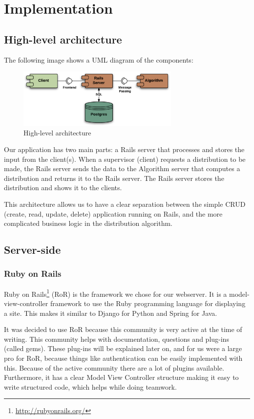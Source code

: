 \section{Implementation}
\subsection{High-level architecture}
The following image shows a UML diagram of the components: 
\begin{figure}[H]
	\caption{High-level architecture}
	\label{fig:high_level_architecture}
	\centering
	\includegraphics[width=8cm]{img/high_level_architecture}
\end{figure}

Our application has two main parts: a Rails server that processes and stores the input from the client(s). When a supervisor (client) requests a distribution to be made, the Rails server sends the data to the Algorithm server that computes a distribution and returns it to the Rails server. The Rails server stores the distribution and shows it to the clients.

This architecture allows us to have a clear separation between the simple CRUD (create, read, update, delete) application running on Rails, and the more complicated business logic in the distribution algorithm.

\subsection{Server-side}
\subsubsection{Ruby on Rails}
Ruby on Rails\footnote{\url{http://rubyonrails.org/}} (RoR) is the framework we chose for our webserver. It is a model-view-controller framework to use the Ruby programming language for displaying a site. This makes it similar to Django for Python and Spring for Java.

It was decided to use RoR because this community is very active at the time of writing. This community helps with documentation, questions and plug-ins (called gems). These plug-ins will be explained later on, and for us were a large pro for RoR, because things like authentication can be easily implemented with this. Because of the active community there are a lot of plugins available. Furthermore, it has a clear Model View Controller structure making it easy to write structured code, which helps while doing teamwork.

